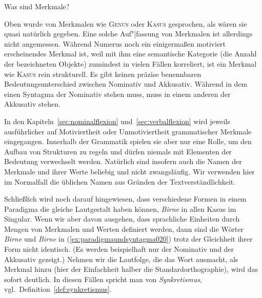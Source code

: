\begin{Vertiefung}{Was sind Merkmale?}
  \label{vert:merkmale}

\noindent Oben wurde von Merkmalen wie \textsc{Genus} oder \textsc{Kasus} gesprochen, als wären sie quasi natürlich gegeben.
Eine solche Auf"|fassung von Merkmalen ist allerdings nicht angemessen.
Während Numerus noch ein einigermaßen motiviert erscheinendes Merkmal ist, weil mit ihm eine semantische Kategorie (die Anzahl der bezeichneten Objekte) zumindest in vielen Fällen korreliert, ist ein Merkmal wie \textsc{Kasus} rein strukturell.
Es gibt keinen präzise benennbaren Bedeutungsunterschied zwischen Nominativ und Akkusativ.
Während in dem einen Syntagma der Nominativ stehen muss, muss in einem anderen der Akkusativ stehen.

In den Kapiteln~\ref{sec:nominalflexion} und~\ref{sec:verbalflexion} wird jeweils ausführlicher auf Motiviertheit oder Unmotiviertheit grammatischer Merkmale eingegangen.
Innerhalb der Grammatik spielen sie aber nur eine Rolle, um den Aufbau von Strukturen zu regeln und dürfen niemals mit Elementen der Bedeutung verwechselt werden.
Natürlich sind insofern auch die Namen der Merkmale und ihrer Werte beliebig und nicht zwangsläufig.
Wir verwenden hier im Normalfall die üblichen Namen aus Gründen der Textverständlichkeit.


\end{Vertiefung}

Schließlich wird noch darauf hingewiesen, dass verschiedene Formen in einem Paradigma die gleiche Lautgestalt haben können, \zB \textit{Birne} in allen Kasus im Singular.
Wenn wir aber davon ausgehen, dass sprachliche Einheiten durch Mengen von Merkmalen und Werten definiert werden, dann sind die Wörter \textit{Birne} und \textit{Birne} in (\ref{ex:paradigmaundsyntagma020}) trotz der Gleichheit ihrer Form nicht identisch.
(Es werden beispielhaft nur der Nominativ und der Akkusativ gezeigt.)
Nehmen wir die Lautfolge, die das Wort ausmacht, als Merkmal hinzu (hier der Einfachheit halber die Standardorthographie), wird das sofort deutlich.
In diesen Fällen spricht man von \textit{Synkretismus}, vgl.\ Definition~\ref{def:synkretismus}.


\begin{exe}
  \ex\label{ex:paradigmaundsyntagma020}
  \begin{xlist}
  \end{xlist}
\end{exe}

